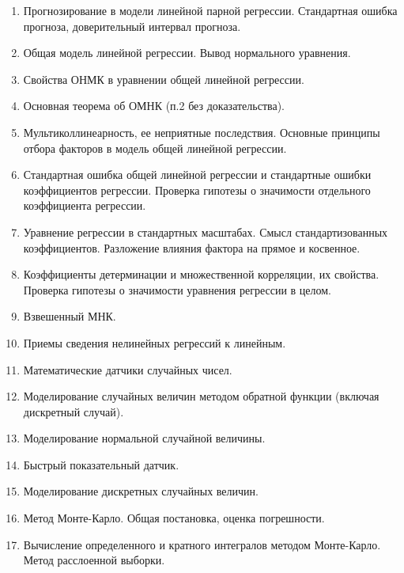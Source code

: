 \documentclass[12pt]{article}
\begin{document}
\begin{enumerate}
    \item Прогнозирование в модели линейной парной регрессии. Стандартная ошибка прогноза, доверительный интервал прогноза.
    \item Общая модель линейной регрессии. Вывод нормального уравнения.
    \item Свойства ОНМК в уравнении общей линейной регрессии.
    \item Основная теорема об ОМНК (п.2 без доказательства).
    \item Мультиколлинеарность, ее неприятные последствия. Основные принципы отбора факторов в модель общей линейной регрессии.
    \item Стандартная ошибка общей линейной регрессии и стандартные ошибки коэффициентов регрессии. Проверка гипотезы о значимости отдельного коэффициента регрессии.
    \item Уравнение регрессии в стандартных масштабах. Смысл стандартизованных коэффициентов. Разложение влияния фактора на прямое и косвенное.
    \item Коэффициенты детерминации и множественной корреляции, их свойства. Проверка гипотезы о значимости уравнения регрессии в целом.
    \item Взвешенный МНК.
    \item Приемы сведения нелинейных регрессий к линейным.
    \item Математические датчики случайных чисел.
    \item Моделирование случайных величин методом обратной функции (включая дискретный случай).
    \item Моделирование нормальной случайной величины.
    \item Быстрый показательный датчик.
    \item Моделирование дискретных случайных величин.
    \item Метод Монте-Карло. Общая постановка, оценка погрешности.
    \item Вычисление определенного и кратного интегралов методом Монте-Карло. Метод расслоенной выборки.
\end{enumerate}

\end{document}

